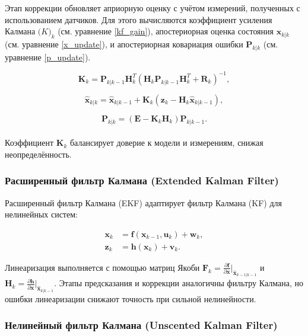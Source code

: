{Этап коррекции обновляет априорную оценку с учётом измерений, полученных с использованием датчиков.
Для этого вычисляются коэффициент усиления Калмана \(\mathbf(K)_k\) (см. уравнение \ref{kf_gain}),
апостериорная оценка состояния \(\mathbf{x}_{k|k}\) (см. уравнение \ref{x_update}),
и апостериорная ковариация ошибки \(\mathbf{P}_{k|k}\) (см. уравнение \ref{p_update}).

\begin{equation}
\label{kf_gain}
\mathbf{K}_k = \mathbf{P}_{k|k-1} \mathbf{H}_k^T (\mathbf{H}_k \mathbf{P}_{k|k-1} \mathbf{H}_k^T + \mathbf{R}_k)^{-1},
\end{equation}

\begin{equation}
\label{x_update}
\hat{\mathbf{x}}_{k|k} = \hat{\mathbf{x}}_{k|k-1} + \mathbf{K}_k (\mathbf{z}_k - \mathbf{H}_k \hat{\mathbf{x}}_{k|k-1}),
\end{equation}

\begin{equation}
\label{p_update}
\mathbf{P}_{k|k} = (\mathbf{E} - \mathbf{K}_k \mathbf{H}_k) \mathbf{P}_{k|k-1}.
\end{equation}
\\

Коэффициент \(\mathbf{K}_k\) балансирует доверие к модели и измерениям, снижая неопределённость.

\subsubsection{Расширенный фильтр Калмана (Extended Kalman Filter)}
\label{ekf}


Расширенный фильтр Калмана (EKF) адаптирует фильтр Калмана (KF) для нелинейных систем:

\begin{align}
    \mathbf{x}_k &= \mathbf{f}(\mathbf{x}_{k-1}, \mathbf{u}_k) + \mathbf{w}_k, \\
    \mathbf{z}_k &= \mathbf{h}(\mathbf{x}_k) + \mathbf{v}_k.
\end{align}

Линеаризация выполняется с помощью матриц Якоби \(\mathbf{F}_k = \frac{\partial \mathbf{f}}{\partial \mathbf{x}}\big|_{\hat{\mathbf{x}}_{k-1|k-1}}\) и \(\mathbf{H}_k = \frac{\partial \mathbf{h}}{\partial \mathbf{x}}\big|_{\hat{\mathbf{x}}_{k|k-1}}\). Этапы предсказания и коррекции аналогичны фильтру Калмана, но ошибки линеаризации снижают точность при сильной нелинейности.

\subsubsection{Нелинейный фильтр Калмана (Unscented Kalman Filter)}
\label{sec:ukf_info}

}
